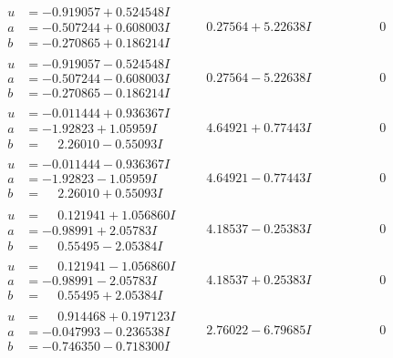 \documentclass[1p]{elsarticle_modified}
\theoremstyle{definition}
\begin{document}
$$\begin{array}{c|c|c}
\begin{aligned}
u &= -0.919057 + 0.524548 I \\
a &= -0.507244 + 0.608003 I \\
b &= -0.270865 + 0.186214 I\end{aligned}
 & \phantom{-}0.27564 + 5.22638 I & \phantom{-0.000000 } 0 \\ \hline\begin{aligned}
u &= -0.919057 - 0.524548 I \\
a &= -0.507244 - 0.608003 I \\
b &= -0.270865 - 0.186214 I\end{aligned}
 & \phantom{-}0.27564 - 5.22638 I & \phantom{-0.000000 } 0 \\ \hline\begin{aligned}
u &= -0.011444 + 0.936367 I \\
a &= -1.92823 + 1.05959 I \\
b &= \phantom{-}2.26010 - 0.55093 I\end{aligned}
 & \phantom{-}4.64921 + 0.77443 I & \phantom{-0.000000 } 0 \\ \hline\begin{aligned}
u &= -0.011444 - 0.936367 I \\
a &= -1.92823 - 1.05959 I \\
b &= \phantom{-}2.26010 + 0.55093 I\end{aligned}
 & \phantom{-}4.64921 - 0.77443 I & \phantom{-0.000000 } 0 \\ \hline\begin{aligned}
u &= \phantom{-}0.121941 + 1.056860 I \\
a &= -0.98991 + 2.05783 I \\
b &= \phantom{-}0.55495 - 2.05384 I\end{aligned}
 & \phantom{-}4.18537 - 0.25383 I & \phantom{-0.000000 } 0 \\ \hline\begin{aligned}
u &= \phantom{-}0.121941 - 1.056860 I \\
a &= -0.98991 - 2.05783 I \\
b &= \phantom{-}0.55495 + 2.05384 I\end{aligned}
 & \phantom{-}4.18537 + 0.25383 I & \phantom{-0.000000 } 0 \\ \hline\begin{aligned}
u &= \phantom{-}0.914468 + 0.197123 I \\
a &= -0.047993 - 0.236538 I \\
b &= -0.746350 - 0.718300 I\end{aligned}
 & \phantom{-}2.76022 - 6.79685 I & \phantom{-0.000000 } 0 \\ \hline\begin{aligned}

\end{aligned}
\end{array}$$
\end{document}
